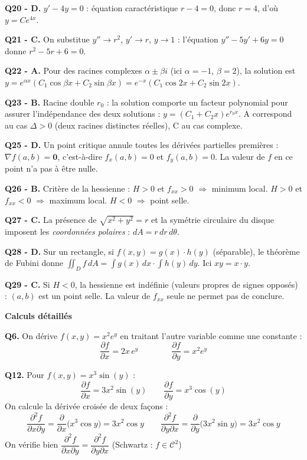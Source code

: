 \documentclass[11pt,a4paper]{article}
\begin{document}
\smallskip
\noindent\textbf{Q20 - D.} $y'-4y=0$ : équation caractéristique $r-4=0$, donc $r=4$, d'où $y=Ce^{4x}$.

\smallskip
\noindent\textbf{Q21 - C.} On substitue $y''\to r^2$, $y'\to r$, $y\to 1$ : l'équation $y''-5y'+6y=0$ donne $r^2-5r+6=0$.

\smallskip
\noindent\textbf{Q22 - A.} Pour des racines complexes $\alpha\pm\beta i$ (ici $\alpha=-1$, $\beta=2$), la solution est $y=e^{\alpha x}(C_1\cos\beta x + C_2\sin\beta x) = e^{-x}(C_1\cos 2x + C_2\sin 2x)$.

\smallskip
\noindent\textbf{Q23 - B.} Racine double $r_0$ : la solution comporte un facteur polynomial pour assurer l'indépendance des deux solutions : $y=(C_1+C_2 x)e^{r_0 x}$. A correspond au cas $\Delta>0$ (deux racines distinctes réelles), C au cas complexe.

\smallskip
\noindent\textbf{Q25 - D.} Un point critique annule toutes les dérivées partielles premières : $\nabla f(a,b)=\mathbf{0}$, c'est-à-dire $f_x(a,b)=0$ et $f_y(a,b)=0$. La valeur de $f$ en ce point n'a pas à être nulle.

\smallskip
\noindent\textbf{Q26 - B.} Critère de la hessienne : $H>0$ et $f_{xx}>0$ $\Rightarrow$ minimum local. $H>0$ et $f_{xx}<0$ $\Rightarrow$ maximum local. $H<0$ $\Rightarrow$ point selle.

\smallskip
\noindent\textbf{Q27 - C.} La présence de $\sqrt{x^2+y^2}=r$ et la symétrie circulaire du disque imposent les \emph{coordonnées polaires} : $dA = r\,dr\,d\theta$.

\smallskip
\noindent\textbf{Q28 - D.} Sur un rectangle, si $f(x,y)=g(x)\cdot h(y)$ (séparable), le théorème de Fubini donne $\iint_D f\,dA = \int g(x)\,dx\cdot\int h(y)\,dy$. Ici $xy = x\cdot y$.

\smallskip
\noindent\textbf{Q29 - C.} Si $H<0$, la hessienne est indéfinie (valeurs propres de signes opposés) : $(a,b)$ est un point selle. La valeur de $f_{xx}$ seule ne permet pas de conclure.

\vspace{6pt}

\noindent\textbf{Calculs détaillés}

\smallskip
\noindent\textbf{Q6.} On dérive $f(x,y) = x^2 e^y$ en traitant l'autre variable comme une constante :
$$\frac{\partial f}{\partial x} = 2x\,e^y \qquad\qquad \frac{\partial f}{\partial y} = x^2 e^y$$

\smallskip
\noindent\textbf{Q12.} Pour $f(x,y) = x^3\sin(y)$ :
$$\frac{\partial f}{\partial x} = 3x^2\sin(y) \qquad \frac{\partial f}{\partial y} = x^3\cos(y)$$
On calcule la dérivée croisée de deux façons :
$$\frac{\partial^2 f}{\partial x\partial y} = \frac{\partial}{\partial x}\bigl(x^3\cos y\bigr) = 3x^2\cos y \qquad \frac{\partial^2 f}{\partial y\partial x} = \frac{\partial}{\partial y}\bigl(3x^2\sin y\bigr) = 3x^2\cos y$$
On vérifie bien $\dfrac{\partial^2 f}{\partial x\partial y} = \dfrac{\partial^2 f}{\partial y\partial x}$ \quad \checkmark \quad (Schwartz : $f\in\mathcal{C}^2$)
\end{document}
